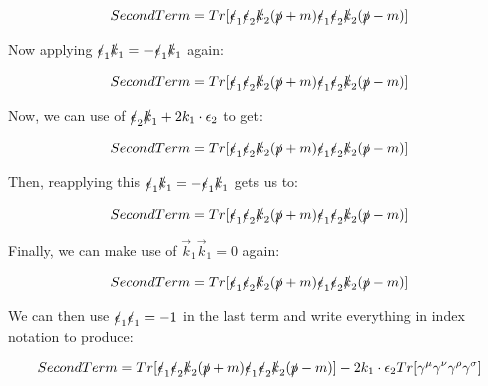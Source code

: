 \documentclass[a4]{article}
\begin{document}
    \begin{equation}
        Second Term = Tr [\slashed{\epsilon}_1 \slashed{\epsilon}_2 \slashed{k}_2 (\slashed{p} + m) \slashed{\epsilon}_1 \slashed{\epsilon}_2 \slashed{k}_2 (\slashed{p} - m)]
    \end{equation}

    Now applying $\slashed{\epsilon}_1 \slashed{k}_1 = - \slashed{\epsilon}_1 \slashed{k}_1$ again:

    \begin{equation}
        Second Term = Tr [\slashed{\epsilon}_1 \slashed{\epsilon}_2 \slashed{k}_2 (\slashed{p} + m) \slashed{\epsilon}_1 \slashed{\epsilon}_2 \slashed{k}_2 (\slashed{p} - m)]
    \end{equation}

    Now, we can use of $\slashed{\epsilon}_2 \slashed{k}_1 + 2 k_1 \cdot \epsilon_2$ to get:

    \begin{equation}
        Second Term = Tr [\slashed{\epsilon}_1 \slashed{\epsilon}_2 \slashed{k}_2 (\slashed{p} + m) \slashed{\epsilon}_1 \slashed{\epsilon}_2 \slashed{k}_2 (\slashed{p} - m)]
    \end{equation}

    Then, reapplying this $\slashed{\epsilon}_1 \slashed{k}_1 = - \slashed{\epsilon}_1 \slashed{k}_1$ gets us to:

    \begin{equation}
        Second Term = Tr [\slashed{\epsilon}_1 \slashed{\epsilon}_2 \slashed{k}_2 (\slashed{p} + m) \slashed{\epsilon}_1 \slashed{\epsilon}_2 \slashed{k}_2 (\slashed{p} - m)]
    \end{equation}

    Finally, we can make use of $\vec{k}_1 \vec{k}_1 = 0$ again:

    \begin{equation}
        Second Term = Tr [\slashed{\epsilon}_1 \slashed{\epsilon}_2 \slashed{k}_2 (\slashed{p} + m) \slashed{\epsilon}_1 \slashed{\epsilon}_2 \slashed{k}_2 (\slashed{p} - m)]
    \end{equation}

    We can then use $\slashed{\epsilon}_1 \slashed{\epsilon}_1 = - 1$ in the last term and write everything in index notation to produce:

    \begin{equation}
        Second Term = Tr [\slashed{\epsilon}_1 \slashed{\epsilon}_2 \slashed{k}_2 (\slashed{p} + m) \slashed{\epsilon}_1 \slashed{\epsilon}_2 \slashed{k}_2 (\slashed{p} - m)] - 2 k_1 \cdot \epsilon_2 Tr [\gamma^\mu \gamma^\nu \gamma^\rho \gamma^\sigma]
    \end{equation}
\end{document}
